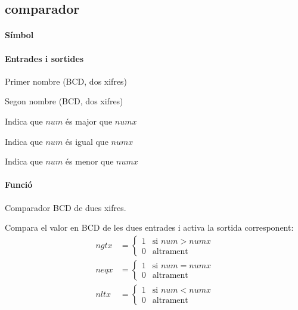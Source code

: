 \subsection{\label{sub:\projectname-comparador} \textsf{comparador}}

\paragraph{Símbol}

\begin{center}  \end{center}

\paragraph{Entrades i sortides}

\begin{where}
\item[\nodenamerange{numx}{7}{0}] Primer nombre (BCD, dos xifres)
\item[\nodenamerange{num}{7}{0}] Segon nombre (BCD, dos xifres)
\item[\nodenamebit{ngtx}] Indica que $num$ és major que $numx$
\item[\nodenamebit{neqx}] Indica que $num$ és igual que $numx$
\item[\nodenamebit{nltx}] Indica que $num$ és menor que $numx$
\end{where}

\paragraph{Funció}

Comparador BCD de dues xifres.

Compara el valor en BCD de les dues entrades i activa la sortida corresponent: 
%
\begin{align*}
  ngtx &= \begin{cases}
    1 & \text{si $num > numx$} \\
    0 & \text{altrament}
  \end{cases} \\
  neqx &= \begin{cases}
    1 & \text{si $num = numx$} \\
    0 & \text{altrament}
  \end{cases} \\
  nltx &= \begin{cases}
    1 & \text{si $num < numx$} \\
    0 & \text{altrament}
  \end{cases}
\end{align*}

